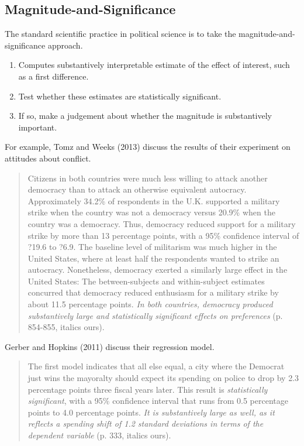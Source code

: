 \documentclass[12pt]{article}
\begin{document}
\subsection*{Magnitude-and-Significance}

The standard scientific practice in political science is to take the magnitude-and-significance approach. 

\begin{enumerate}
\item Computes substantively interpretable estimate of the effect of interest, such as a first difference.
\item Test whether these estimates are statistically significant.
\item If so, make a judgement about whether the magnitude is substantively important.
\end{enumerate}

For example, Tomz and Weeks (2013) discuss the results of their experiment on attitudes about conflict.

\begin{quote}
Citizens in both countries were much less willing to attack another democracy than to attack an otherwise equivalent autocracy. Approximately 34.2\% of respondents in the U.K. supported a military strike when the country was not a democracy versus 20.9\% when the country was a democracy. Thus, democracy reduced support for a military strike by more than 13 percentage points, with a 95\% confidence interval of ?19.6 to ?6.9. The baseline level of militarism was much higher in the United States, where at least half the respondents wanted to strike an autocracy. Nonetheless, democracy exerted a similarly large effect in the United States: The between-subjects and within-subject estimates concurred that democracy reduced enthusiasm for a military strike by about 11.5 percentage points. \emph{In both countries, democracy produced substantively large and statistically significant effects on preferences} (p. 854-855, italics ours).
\end{quote}

Gerber and Hopkins (2011) discuss their regression model.

\begin{quote}
The first model indicates that all else equal, a city where the Democrat just wins the mayoralty should expect its spending on police to drop by 2.3 percentage points three fiscal years later. This result is \emph{statistically significant}, with a 95\% confidence interval that runs from 0.5 percentage points to 4.0 percentage points. \emph{It is substantively large as well, as it reflects a spending shift of 1.2 standard deviations in terms of the dependent variable} (p. 333, italics ours).
\end{quote}
\end{document}
